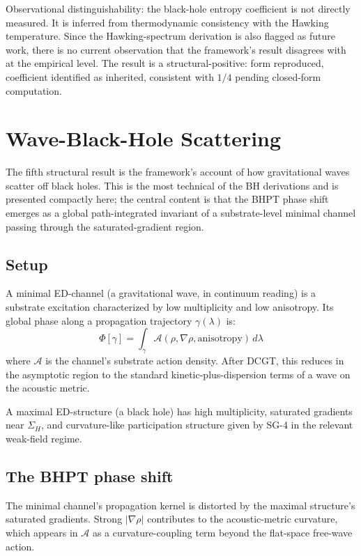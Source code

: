 \documentclass[11pt,a4paper]{article}
\begin{document}
Observational distinguishability: the black-hole entropy coefficient is not directly measured. It is inferred from thermodynamic consistency with the Hawking temperature. Since the Hawking-spectrum derivation is also flagged as future work, there is no current observation that the framework's result disagrees with at the empirical level. The result is a structural-positive: form reproduced, coefficient identified as inherited, consistent with $1/4$ pending closed-form computation.

\section{Wave-Black-Hole Scattering}

The fifth structural result is the framework's account of how gravitational waves scatter off black holes. This is the most technical of the BH derivations and is presented compactly here; the central content is that the BHPT phase shift emerges as a global path-integrated invariant of a substrate-level minimal channel passing through the saturated-gradient region.

\subsection{Setup}

A minimal ED-channel (a gravitational wave, in continuum reading) is a substrate excitation characterized by low multiplicity and low anisotropy. Its global phase along a propagation trajectory $\gamma(\lambda)$ is:
\[
\Phi[\gamma] = \int_\gamma \mathcal{A}(\rho, \nabla\rho, \text{anisotropy})\, d\lambda
\]
where $\mathcal{A}$ is the channel's substrate action density. After DCGT, this reduces in the asymptotic region to the standard kinetic-plus-dispersion terms of a wave on the acoustic metric.

A maximal ED-structure (a black hole) has high multiplicity, saturated gradients near $\Sigma_H$, and curvature-like participation structure given by SG-4 in the relevant weak-field regime.

\subsection{The BHPT phase shift}

The minimal channel's propagation kernel is distorted by the maximal structure's saturated gradients. Strong $|\nabla\rho|$ contributes to the acoustic-metric curvature, which appears in $\mathcal{A}$ as a curvature-coupling term beyond the flat-space free-wave action.
\end{document}
